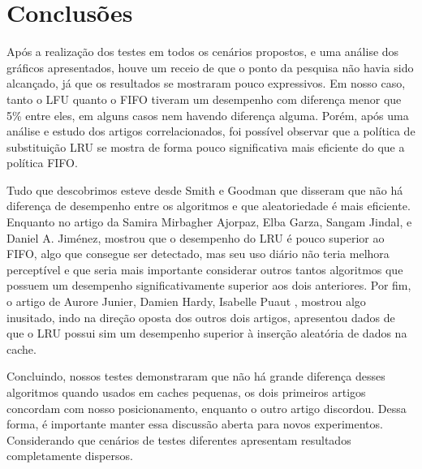 \documentclass[conference]{IEEEtran}
\begin{document}
\section{Conclusões}


Após a realização dos testes em todos os cenários propostos, e uma análise dos gráficos apresentados, houve um 
receio de que o ponto da pesquisa não havia sido alcançado, já que os resultados se mostraram pouco expressivos. 
Em nosso caso, tanto o LFU quanto o FIFO tiveram um desempenho com diferença menor que 5\% entre eles, em alguns 
casos nem havendo diferença alguma. Porém, após uma análise e estudo dos artigos correlacionados, foi possível observar que 
a política de substituição LRU se mostra de forma pouco significativa mais eficiente do que a política FIFO. 

Tudo que descobrimos esteve desde Smith e Goodman \cite{b1} que disseram que não há diferença de desempenho entre os algoritmos 
e que aleatoriedade é mais eficiente. Enquanto no artigo da Samira Mirbagher Ajorpaz, Elba Garza, Sangam Jindal, e Daniel A. Jiménez\cite{b3}, 
mostrou que o desempenho do LRU é pouco superior ao FIFO, algo que consegue ser detectado, mas seu uso diário não teria melhora perceptível e 
que seria mais importante considerar outros tantos algoritmos que possuem um desempenho significativamente superior aos dois anteriores. Por fim, 
o artigo de Aurore Junier, Damien Hardy, Isabelle Puaut \cite{b2}, mostrou algo inusitado, indo na direção oposta dos outros dois artigos, 
apresentou dados de que o LRU possui sim um desempenho superior à inserção aleatória de dados na cache.

Concluindo, nossos testes demonstraram que não há grande diferença desses algoritmos quando usados em caches pequenas, os dois primeiros artigos
concordam com nosso posicionamento, enquanto o outro artigo discordou. Dessa forma, é importante manter essa discussão aberta para novos experimentos.
Considerando que cenários de testes diferentes apresentam resultados completamente dispersos.
\end{document}
